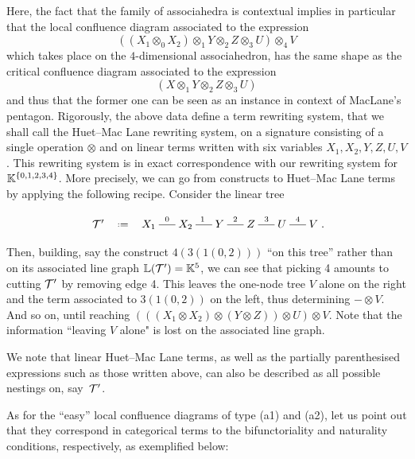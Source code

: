 Here, the fact that the family of associahedra is contextual implies in particular that the local confluence diagram associated to the expression
$$((X_1\otimes_0 X_2)\otimes_1 Y\otimes_2 Z\otimes_3 U)\otimes_4 V $$
which takes place on the $4$-dimensional associahedron, has the same shape as the critical confluence diagram associated to the expression
$$ (X \otimes_1 Y \otimes_2 Z \otimes_3 U)$$
and thus that the former one can be seen as an instance in context of MacLane's pentagon.  
Rigorously, the above data define a term rewriting system, that we shall call the Huet--Mac Lane rewriting system, on a signature consisting of a single operation $\otimes$ and on linear terms written with six variables  $X_1,X_2,Y,Z,U,V$. 
This rewriting system is in exact correspondence with our rewriting system for  ${\mathbb K}^{\left\{0,1,2,3,4\right\}}$. 
More precisely, we can go from constructs to  Huet--Mac Lane terms by applying the following recipe. 
Consider the linear tree 
\vspace{-.5cm}
\begin{center}
$$\xymatrix @-1.65pc {{\cal T}' & \eqdef  &X_1 \ar @{-}[rr]^{0}&& X_2 \ar @{-}[rr]^{1}&& Y \ar @{-}[rr]^{2}&& Z \ar @{-}[rr]^{3}&& U \ar @{-}[rr]^{4}&& V}.
  $$
  \end{center}
Then, building, say the construct $4(3(1(0,2)))$ ``on this tree'' rather than on its associated  line graph $\mathbb{L}({\cal T}')={\mathbb K}^5$, we can see that picking 4 amounts to cutting $\cal T'$ by removing edge 4. This leaves  the one-node tree $V$ alone on the right and the term associated to $3(1(0,2))$ on the left, thus determining $-\otimes V$. And so on, until reaching $( ((X_1\otimes X_2)\otimes  (Y\otimes Z))\otimes U)\otimes V $. 
Note that the information ``leaving $V$ alone" is lost on the associated line graph. 

We note that linear Huet--Mac Lane terms, as well as the  partially parenthesised expressions such as those written above, can also be described as all possible nestings on, say~${\cal T'}$.

As for the ``easy'' local confluence diagrams of type (a1) and (a2), let us point out that they correspond in categorical terms to the bifunctoriality and naturality conditions, respectively, as exemplified below:
\begin{center}
\end{center}

